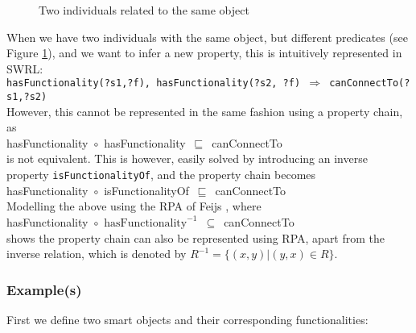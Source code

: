 \begin{figure}[bth]
	\caption{Two individuals related to the same object}
	\label{canConnectTo2}        
\end{figure}

When we have two individuals with the same object, but different predicates (see Figure \ref{canConnectTo2}), and we want to infer a new property, this is intuitively represented in \ac{SWRL}: \\

\noindent
\texttt{hasFunctionality(?s1,?f), hasFunctionality(?s2, ?f) $\Rightarrow$ canConnectTo(?s1,?s2)}\\

However, this cannot be represented in the same fashion using a property chain, as\\ 

\noindent
hasFunctionality~\ensuremath{\circ}~hasFunctionality~\ensuremath{\sqsubseteq}~canConnectTo\\

is not equivalent. This is however, easily solved by introducing an inverse property \texttt{isFunctionalityOf}, and the property chain becomes\\

\noindent
hasFunctionality~\ensuremath{\circ}~isFunctionalityOf~\ensuremath{\sqsubseteq}~canConnectTo\\

Modelling the above using the \ac{RPA} of Feijs \cite{Feijs1999}, where\\
\label{RPA}
\noindent
hasFunctionality~\ensuremath{\circ}~$\text{hasFunctionality}^{-1}$~\ensuremath{\subseteq}~canConnectTo\\

shows the property chain can also be represented using \ac{RPA}, apart from the inverse relation, which is denoted by  $R^{-1} = \{ (x,y) | (y,x) \in R \}$.

\subsubsection{Example(s)}

First we define two smart objects and their corresponding functionalities:

